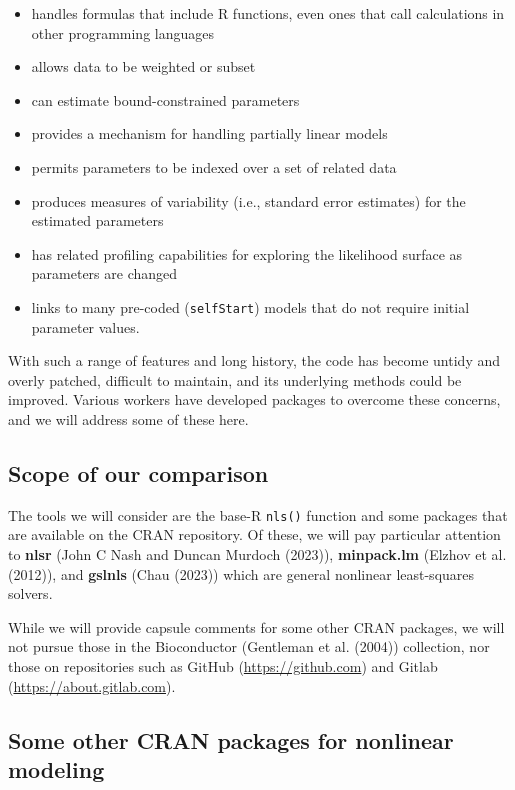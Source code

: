 \begin{itemize}
\tightlist
\item
  handles formulas that include R functions, even ones that call calculations in
  other programming languages
\item
  allows data to be weighted or subset
\item
  can estimate bound-constrained parameters
\item
  provides a mechanism for handling partially linear models
\item
  permits parameters to be indexed over a set of related data
\item
  produces measures of variability (i.e., standard error estimates) for the
  estimated parameters
\item
  has related profiling capabilities for exploring the likelihood surface as
  parameters are changed
\item
  links to many pre-coded (\texttt{selfStart}) models that do not require
  initial parameter values.
\end{itemize}

With such a range of features and long history, the code has become untidy
and overly patched, difficult to maintain, and its underlying methods could
be improved. Various workers have developed packages to overcome these
concerns, and we will address some of these here.

\hypertarget{scope-of-our-comparison}{%
\subsection{Scope of our comparison}\label{scope-of-our-comparison}}

The tools we will consider are the base-R \texttt{nls()} function
and some packages that are available on the CRAN repository.
Of these, we will pay particular attention to \textbf{nlsr} (John C Nash and Duncan Murdoch (2023)),
\textbf{minpack.lm} (Elzhov et al. (2012)), and \textbf{gslnls} (Chau (2023)) which are
general nonlinear least-squares solvers.

While we will provide capsule comments for some other CRAN packages,
we will not pursue those in the Bioconductor (Gentleman et al. (2004))
collection, nor those on repositories such as
GitHub (\url{https://github.com}) and Gitlab (\url{https://about.gitlab.com}).

\hypertarget{some-other-cran-packages-for-nonlinear-modeling}{%
\subsection{Some other CRAN packages for nonlinear modeling}\label{some-other-cran-packages-for-nonlinear-modeling}}

